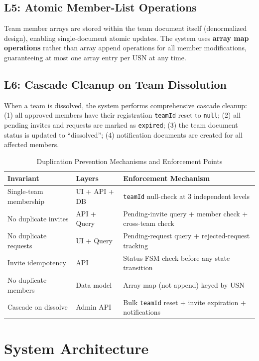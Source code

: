 \documentclass[12pt,a4paper]{article}
\begin{document}
\subsection{L5: Atomic Member-List Operations}

Team member arrays are stored within the team document itself (denormalized design), enabling single-document atomic updates. The system uses \textbf{array map operations} rather than array append operations for all member modifications, guaranteeing at most one array entry per USN at any time.

\subsection{L6: Cascade Cleanup on Team Dissolution}

When a team is dissolved, the system performs comprehensive cascade cleanup: (1) all approved members have their registration \texttt{teamId} reset to \texttt{null}; (2) all pending invites and requests are marked as \texttt{expired}; (3) the team document status is updated to ``dissolved''; (4) notification documents are created for all affected members.

\begin{table}[H]
\centering
\caption{Duplication Prevention Mechanisms and Enforcement Points}
\begin{tabular}{@{}p{3cm}p{2.5cm}p{5.5cm}@{}}
\toprule
\textbf{Invariant} & \textbf{Layers} & \textbf{Enforcement Mechanism} \\
\midrule
Single-team membership & UI + API + DB & \texttt{teamId} null-check at 3 independent levels \\
No duplicate invites & API + Query & Pending-invite query + member check + cross-team check \\
No duplicate requests & UI + Query & Pending-request query + rejected-request tracking \\
Invite idempotency & API & Status FSM check before any state transition \\
No duplicate members & Data model & Array map (not append) keyed by USN \\
Cascade on dissolve & Admin API & Bulk \texttt{teamId} reset + invite expiration + notifications \\
\bottomrule
\end{tabular}
\end{table}

\section{System Architecture}
\end{document}
